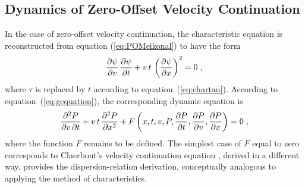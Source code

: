 \subsection{Dynamics of Zero-Offset Velocity Continuation}
In the case of zero-offset velocity continuation, the characteristic
equation is reconstructed from equation (\ref{eq:POMeikonal}) to have
the form
\begin{equation}
{{\partial \psi} \over {\partial v}}\,
{{\partial \psi} \over {\partial t}} +
v\,t\,\left({{\partial \psi} \over {\partial x}}\right)^2 = 0\;,
\label{eq:POMchar} 
\end{equation}
where $\tau$ is replaced by $t$ according to
equation~(\ref{eq:chartau}).  According to
equation~(\ref{eq:gequation}), the corresponding dynamic equation is
\begin{equation}
{{\partial^2 P} \over {\partial v\, \partial t}} +
v\,t\,{{\partial^2 P} \over {\partial x^2}} +
F\left(x,t,v,P,
{{\partial P} \over {\partial t}},
{{\partial P} \over {\partial v}},
{{\partial P} \over {\partial x}}
\right) = 0\;,
\label{eq:POMequation} 
\end{equation}
where the function $F$ remains to be defined. The simplest case of $F$
equal to zero corresponds to Claerbout's velocity continuation
equation \cite[]{Claerbout.sep.48.79}, derived in a different way.
\cite{Levin.sep.48.101} provides the dispersion-relation derivation,
conceptually analogous to applying the method of characteristics.

